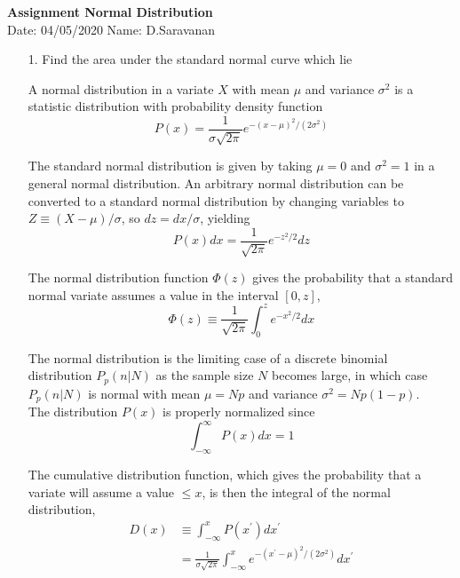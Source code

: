 \documentclass[a4paper,11pt,openright]{report}
\begin{document}
\singlespacing
\pagestyle{plain}

\begin{center}
\textbf{Assignment Normal Distribution} \\
Date: 04/05/2020 \hspace{2mm} Name: D.Saravanan
\end{center}

\vspace{10px}

\begin{enumerate}

\item[1.] Find the area under the standard normal curve which lie 

A normal distribution in a variate $X$ with mean $\mu$ and variance $\sigma^{2}$ is
a statistic distribution with probability density function 
\begin{equation*}
P(x) = \frac{1}{\sigma \sqrt{2\pi}} e^{-(x-\mu)^{2}/(2\sigma^{2})} 
\end{equation*}

The standard normal distribution is given by taking $\mu = 0$ and $\sigma^{2} = 1$ in 
a general normal distribution. An arbitrary normal distribution can be converted to a
standard normal distribution by changing variables to $Z \equiv (X-\mu)/\sigma$, so
$dz = dx/\sigma$, yielding
\begin{equation*}
P(x) dx = \frac{1}{\sqrt{2\pi}} e^{-z^{2}/2} dz
\end{equation*}

The normal distribution function $\Phi(z)$ gives the probability that a standard normal
variate assumes a value in the interval $[0,z]$,
\begin{equation*}
\Phi(z) \equiv \frac{1}{\sqrt{2\pi}} \int_{0}^{z} e^{-x^{2}/2} dx
\end{equation*}

The normal distribution is the limiting case of a discrete binomial distribution
$P_{p}(n|N)$ as the sample size $N$ becomes large, in which case $P_{p}(n|N)$ is normal with
mean $\mu = N p$ and variance $\sigma^{2} = N p(1-p)$. \\

The distribution $P(x)$ is properly normalized since 
\begin{equation*}
\int_{-\infty}^{\infty} P(x) dx = 1
\end{equation*}

The cumulative distribution function, which gives the probability that a variate will assume
a value $\leq x$, is then the integral of the normal distribution,
\begin{equation*}
\begin{split}
D(x) & \equiv \int_{-\infty}^{x} P(x^{'}) dx^{'} \\
& = \frac{1}{\sigma\sqrt{2\pi}} \int_{-\infty}^{x} e^{-(x^{'}-\mu)^{2}/(2\sigma^{2})} dx^{'}
\end{split}
\end{equation*}


\end{enumerate}
\end{document}
